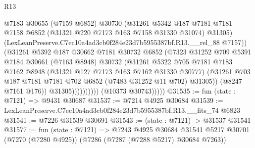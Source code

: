 \begin{lexlean}{R13}
\begin{coremodule}
                                @7183
                                @30655
                                (@7159 @6852)
                                @30730
                                (@31261
                                  @5342
                                  @187
                                  @7181
                                  @7181
                                  @7158
                                  @6852
                                  (@31321 @220 @7173 @163 @7158 @31330 @31074)
                                  @31305)
                                (LexLeanPreserve.C7ec10a4ad3cb0f284e23d7b5955387bf.R13.__rel_88
                                  @7157))
                              (@31261
                                @5392
                                @187
                                @30662
                                @7181
                                @30732
                                @6852
                                (@7323
                                  @31252
                                  @709
                                  @5391
                                  @7184
                                  @30661
                                  (@7163 @8948)
                                  @30732
                                  (@31261
                                    @5322
                                    @705
                                    @7181
                                    @7183
                                    @7162
                                    @8948
                                    (@31321 @127 @7173 @163 @7162 @31330 @30777)
                                    (@31261
                                      @703
                                      @187
                                      @7181
                                      @7181
                                      @702
                                      @6852
                                      (@7483 @31252 @11 @702)
                                      @31305))
                                  (@8247 @7161 @176))
                                @31305))))))))))
            (@10373 @30743)))))
@31535 := fun (state : @7121) => @9431 @30687
@31537 := @7214 @4925 @30684
@31539 := LexLeanPreserve.C7ec10a4ad3cb0f284e23d7b5955387bf.R13.__fits_74 @6823
@31541 := @7226 @31539 @30691
@31543 := (state : @7121) -> @31537 @31541
@31577 := fun (state : @7121) =>
  @7243
    @4925
    @30684
    @31541
    @5217
    @30701
    (@7270 (@7280 @4925))
    (@7286 (@7287 (@7288 @5217) @30684 @7263))

\end{coremodule}
\end{lexlean}
